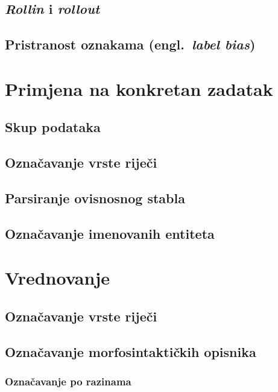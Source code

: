\documentclass[times, utf8, diplomski]{fer}
\begin{document}
\section{\emph{Rollin} i \emph{rollout}}
\section{Pristranost oznakama (engl.~\emph{label bias})}


\chapter{Primjena na konkretan zadatak}

\section{Skup podataka}

\section{Označavanje vrste riječi}

\section{Parsiranje ovisnosnog stabla}


\section{Označavanje imenovanih entiteta}

\chapter{Vrednovanje}

\section{Označavanje vrste riječi}

\section{Označavanje morfosintaktičkih opisnika}

\subsection{Označavanje po razinama}
\end{document}
